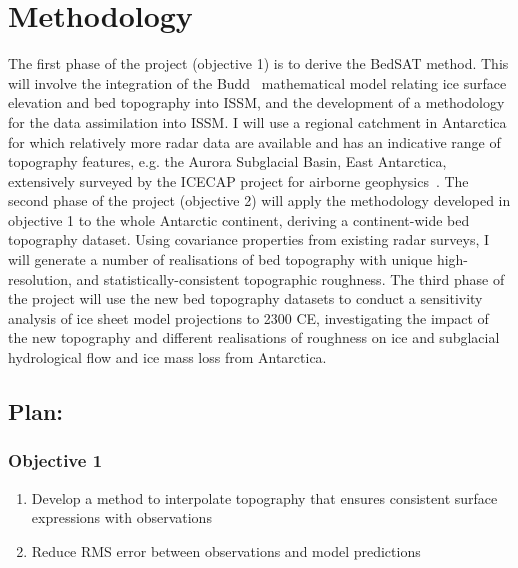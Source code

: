 \chapter{Methodology}

The first phase of the project (objective 1) is to derive the BedSAT method. This will involve the integration of the Budd~\cite{Budd_1970} mathematical model relating ice surface elevation and bed topography into ISSM, and the development of a methodology for the data assimilation into ISSM. I will use a regional catchment in Antarctica for which relatively more radar data are available and has an indicative range of topography features, e.g. the Aurora Subglacial Basin, East Antarctica, extensively surveyed by the ICECAP project for airborne geophysics~\cite{Young_2011}. The second phase of the project (objective 2) will apply the methodology developed in objective 1 to the whole Antarctic continent, deriving a continent-wide bed topography dataset. Using covariance properties from existing radar surveys, I will generate a number of realisations of bed topography with unique high-resolution, and statistically-consistent topographic roughness. The third phase of the project will use the new bed topography datasets to conduct a sensitivity analysis of ice sheet model projections to 2300 CE, investigating the impact of the new topography and different realisations of roughness on ice and subglacial hydrological flow and ice mass loss from Antarctica.\\

\section*{Plan:}
\subsection*{Objective 1}
\begin{enumerate}
\item Develop a method to interpolate topography that ensures consistent surface expressions with observations
\item Reduce RMS error between observations and model predictions
\end{enumerate}

